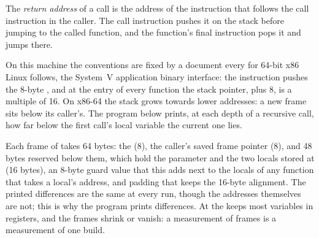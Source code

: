 \begin{definition}\label{def:b1:c-functions-and-stack:return-address}
The \emph{return address} of a call is the address of the instruction that follows the call
instruction in the caller. The call instruction pushes it on the stack before jumping to the called function, and
the function's final  instruction pops it and jumps there.
\end{definition}

On this machine the conventions are fixed by a document every  for 64-bit x86 Linux follows, the System~V
application binary interface: the  instruction pushes the 8-byte , and at the entry of
every function the stack pointer, plus 8, is a multiple of 16. On x86-64 the stack grows towards lower addresses:
a new frame sits below its caller's. The program below prints, at each depth of a recursive call, how far below the
first call's local variable the current one lies.

\label{lst:b1:c-functions-and-stack:frames}

\label{out:b1:c-functions-and-stack:frames}

Each frame of  takes 64 bytes: the  (8), the caller's saved frame pointer (8), and
48 bytes reserved below them, which hold the parameter and the two locals stored at  (16 bytes), an
8-byte guard value that this  adds next to the locals of any function that takes a local's address, and
padding that keeps the 16-byte alignment. The printed differences
are the same at every run, though the addresses themselves are not; this is why the program prints differences.
At  the  keeps most variables in registers, and the frames shrink or vanish: a measurement of
frames is a measurement of one build.

